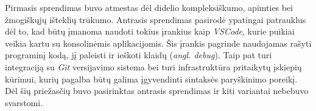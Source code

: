 \begin{activities}
{        Pirmasis sprendimas buvo atmestas dėl didelio kompleksiškumo, apimties bei žmogiškųjų išteklių trūkumo. Antrasis sprendimas pasirodė ypatingai patrauklus dėl to, kad būtų įmanoma naudoti tokius įrankius kaip \textit{VSCode}, kurie puikiai veikia kartu su konsolinėmis aplikacijomis. Šis įrankis pagrinde naudojamas rašyti programinį kodą, jį paleisti ir ieškoti klaidų (\textit{angl. debug}). Taip pat turi integraciją su \textit{Git} versijavimo sistema bei turi infrastruktūra pritaikytų įskiepių kūrimui, kurių pagalba būtų galima įgyvendinti sintaksės paryškinimo poreikį. Dėl šių priežasčių buvo pasirinktas antrasis sprendimas ir kiti variantai nebebuvo svarstomi.
    }
     \row

    \rezultatai{

    } \row


\end{activities}